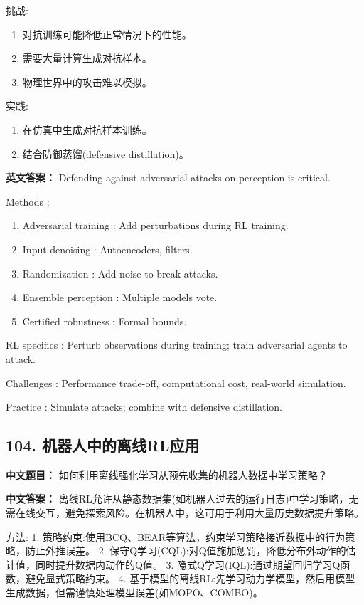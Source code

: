 \documentclass[10pt,a4paper]{ctexart}
\begin{document}
 挑战:
\begin{enumerate}
    \item 对抗训练可能降低正常情况下的性能。
    \item 需要大量计算生成对抗样本。
    \item 物理世界中的攻击难以模拟。
\end{enumerate}

 实践:
\begin{enumerate}
    \item 在仿真中生成对抗样本训练。
    \item 结合防御蒸馏(defensive distillation)。
\end{enumerate}

\textbf{英文答案：}  
Defending against adversarial attacks on perception is critical.

 Methods :
\begin{enumerate}
    \item Adversarial training : Add perturbations during RL training.
    \item Input denoising : Autoencoders, filters.
    \item Randomization : Add noise to break attacks.
    \item Ensemble perception : Multiple models vote.
    \item Certified robustness : Formal bounds.
\end{enumerate}

 RL specifics : Perturb observations during training; train adversarial agents to attack.

 Challenges : Performance trade-off, computational cost, real-world simulation.

 Practice : Simulate attacks; combine with defensive distillation.

\subsection*{104. 机器人中的离线RL应用}
\textbf{中文题目：} 如何利用离线强化学习从预先收集的机器人数据中学习策略？

\textbf{中文答案：}  
离线RL允许从静态数据集(如机器人过去的运行日志)中学习策略，无需在线交互，避免探索风险。在机器人中，这可用于利用大量历史数据提升策略。

 方法:
1.  策略约束:使用BCQ、BEAR等算法，约束学习策略接近数据中的行为策略，防止外推误差。
2.  保守Q学习(CQL):对Q值施加惩罚，降低分布外动作的估计值，同时提升数据内动作的Q值。
3.  隐式Q学习(IQL):通过期望回归学习Q函数，避免显式策略约束。
4.  基于模型的离线RL:先学习动力学模型，然后用模型生成数据，但需谨慎处理模型误差(如MOPO、COMBO)。
\end{document}

